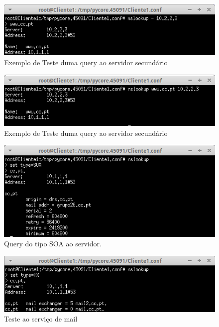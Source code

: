\documentclass{llncs}
\begin{document}
\begin{figure}[H]
\begin{center}
\includegraphics[scale=0.75]{teste5.png}
\end{center}
\caption{\label{fig:t5}Exemplo de Teste duma query ao servidor secundário}
\end{figure}

\begin{figure}[H]
\begin{center}
\includegraphics[scale=0.75]{teste6.png}
\end{center}
\caption{\label{fig:t6}Exemplo de Teste duma query ao servidor secundário}
\end{figure}

\begin{figure}[H]
\begin{center}
\includegraphics[scale=0.75]{teste7.png}
\end{center}
\caption{\label{fig:t7}Query do tipo SOA ao servidor.}
\end{figure}

\begin{figure}[H]
\begin{center}
\includegraphics[scale=0.75]{teste8.png}
\end{center}
\caption{\label{fig:t8}Teste ao serviço de mail}
\end{figure}
\end{document}
